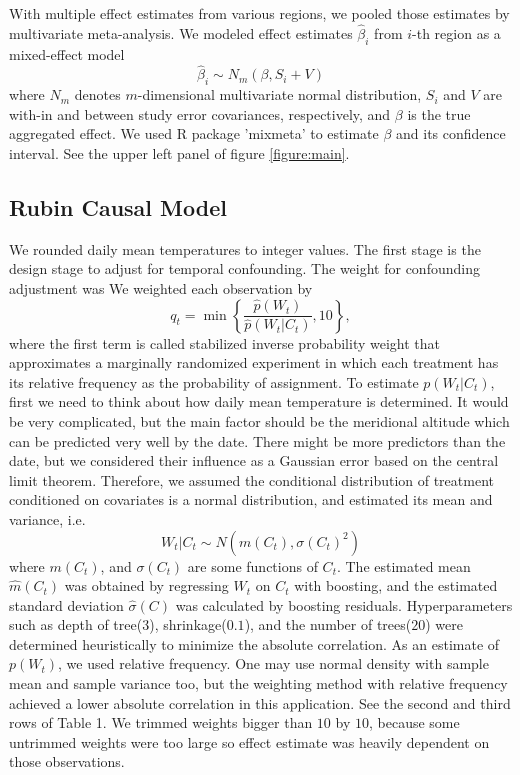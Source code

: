 \documentclass[12pt]{article}
\begin{document}
With multiple effect estimates from various regions,
we pooled those estimates by multivariate meta-analysis.
We modeled effect estimates $\hat{\beta}_i$ from $i$-th region as a mixed-effect model
\[
	\hat{\beta}_i \sim N_m(\beta, S_i + V)
\]
where $N_m$ denotes $m$-dimensional multivariate normal distribution,
$S_i$ and $V$ are with-in and between study error covariances, respectively,
and $\beta$ is the true aggregated effect.
We used R package 'mixmeta' to estimate $\beta$ and its confidence interval.
See the upper left panel of figure \ref{figure:main}.


\subsection{Rubin Causal Model}

We rounded daily mean temperatures to integer values.
The first stage is the design stage to adjust for temporal confounding.
The weight for confounding adjustment was 
We weighted each observation by 
\[
	q_t = \min{ \left \{ \frac{\hat{p}(W_t)}{\hat{p}(W_t \lvert C_t)}, 10 \right \} },
\]
where the first term is called stabilized inverse probability weight\cite{sipw2010}
that approximates a marginally randomized experiment
in which each treatment has its relative frequency as the probability of assignment.
To estimate $p(W_t \lvert C_t)$, 
first we need to think about how daily mean temperature is determined.
It would be very complicated, 
but the main factor should be the meridional altitude
which can be predicted very well by the date.
There might be more predictors than the date,
but we considered their influence as a Gaussian error based on the central limit theorem.
Therefore, we assumed
the conditional distribution of treatment conditioned on covariates is a normal distribution, 
and estimated its mean and variance, i.e.
\[ 
	W_t\lvert C_t \sim N(m(C_t), \sigma(C_t)^2) 
\] 
where $m(C_t)$, and $\sigma(C_t)$ are some functions of $C_t$.
The estimated mean $\hat{m}(C_t)$ was obtained by regressing $W_t$ on $C_t$ with boosting, 
and the estimated standard deviation $\hat{\sigma}(C)$ was calculated
by boosting residuals\cite{hirano2004, gpsboosting2015}.
Hyperparameters such as depth of tree($3$), shrinkage($0.1$), and the number of trees($20$) 
were determined heuristically to minimize the absolute correlation.
As an estimate of $p(W_t)$, we used relative frequency.
One may use normal density with sample mean and sample variance too, but
the weighting method with relative frequency achieved a lower absolute correlation in this application.
See the second and third rows of Table 1.
We trimmed weights bigger than $10$ by $10$,
because some untrimmed weights were too large so
effect estimate was heavily dependent on those observations.
\end{document}
